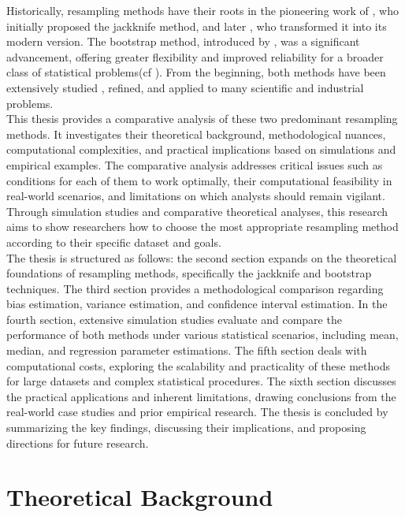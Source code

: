 \documentclass[aodsor,preprint]{imsart}
\numberwithin{equation}{section}
\theoremstyle{plain}
\begin{document}
Historically, resampling methods have their roots in the pioneering work of \cite{quenouille1949}, who initially proposed the jackknife method, and later \cite{tukey1958bias}, who transformed it into its modern version. The bootstrap method, introduced by \cite{efron1979}, was a significant advancement, offering greater flexibility and improved reliability for a broader class of statistical problems(cf \cite{efron1993introduction,shao1995jackknife}). From the beginning, both methods have been extensively studied , refined, and applied to many scientific and industrial problems.\\

This thesis provides a comparative analysis of these two predominant resampling methods. It investigates their theoretical background, methodological nuances, computational complexities, and practical implications based on simulations and empirical examples. The comparative analysis addresses critical issues such as conditions for each of them to work optimally, their computational feasibility in real-world scenarios, and limitations on which analysts should remain vigilant. Through simulation studies and comparative theoretical analyses, this research aims to show researchers how to choose the most appropriate resampling method according to their specific dataset and goals. \\

The thesis is structured as follows: the second section expands on the theoretical foundations of resampling methods, specifically the jackknife and bootstrap techniques. The third section provides a methodological comparison regarding bias estimation, variance estimation, and confidence interval estimation. In the fourth section, extensive simulation studies evaluate and compare the performance of both methods under various statistical scenarios, including mean, median, and regression parameter estimations. The fifth section deals with computational costs, exploring the scalability and practicality of these methods for large datasets and complex statistical procedures. The sixth section discusses the practical applications and inherent limitations, drawing conclusions from the real-world case studies and prior empirical research. The thesis is concluded by summarizing the key findings, discussing their implications, and proposing directions for future research. \\

\section{Theoretical Background}
\end{document}
